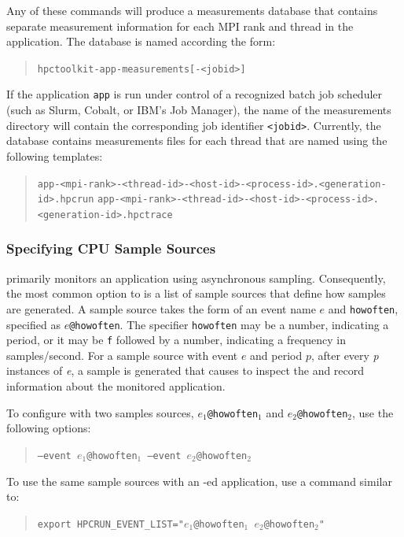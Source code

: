 \documentclass[11pt,twoside,letterpaper]{report}
\begin{document}
%
Any of these commands will produce a measurements database that contains separate measurement information for each MPI rank and thread in the application.
The database is named according the form:
\begin{quote}
  \verb|hpctoolkit-app-measurements[-<jobid>]|
\end{quote}
If the application \texttt{app} is run under control of a recognized batch job scheduler (such as Slurm, Cobalt, or IBM's Job Manager), the name of the measurements directory will contain the corresponding job identifier \texttt{<jobid>}.
Currently, the database contains measurements files for each thread that are named using the following templates:
\begin{quote}
  \verb|app-<mpi-rank>-<thread-id>-<host-id>-<process-id>.<generation-id>.hpcrun|
    \verb|app-<mpi-rank>-<thread-id>-<host-id>-<process-id>.<generation-id>.hpctrace|
\end{quote}

\subsubsection{Specifying CPU Sample Sources}

\HPCToolkit{} primarily monitors an application using asynchronous sampling.
Consequently, the most common option to \hpcrun{} is a list of sample sources that define how samples are generated.
A sample source takes the form of an event name $e$ and \texttt{howoften}, specified as \texttt{$e$@howoften}. The specifier \texttt{howoften} may
be a number, indicating a period, \eg{}  or it may be \texttt{f} followed by a number,  indicating a frequency in samples/second.
For a sample source with event $e$ and period $p$, after every \emph{p} instances of \emph{e}, a sample is generated that causes \hpcrun{} to inspect the and record information about the monitored application.

To configure \hpcrun{} with two samples sources, \texttt{$e_1$@howoften$_1$} and \texttt{$e_2$@howoften$_2$}, use the following options:
\begin{quote}
  \texttt{--event $e_1$@howoften$_1$ --event $e_2$@howoften$_2$}
\end{quote}
To use the same sample sources with an \hpclink{}-ed application, use a command similar to:
\begin{quote}
  \texttt{export HPCRUN\_EVENT\_LIST="$e_1$@howoften$_1$ $e_2$@howoften$_2$"}
\end{quote}
\end{document}
